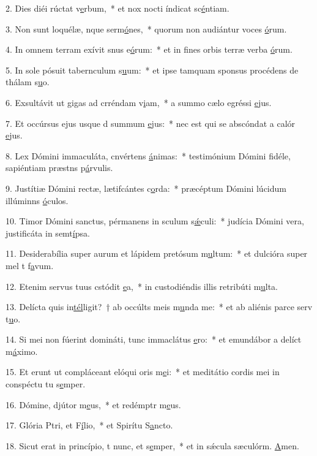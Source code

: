 2. Dies diéi rúctat v\uline{e}rbum,~* et nox nocti índicat sc\uline{é}ntiam.\par 
3. Non sunt loquélæ, nque serm\uline{ó}nes,~* quorum non audiántur voces \uline{ó}rum.\par 
4. In omnem terram exívit snus e\uline{ó}rum:~* et in fines orbis terræ verba \uline{ó}rum.\par 
5. In sole pósuit tabernculum s\uline{u}um:~* et ipse tamquam sponsus procédens de thálam s\uline{u}o.\par 
6. Exsultávit ut gigas ad crréndam v\uline{i}am,~* a summo cælo egréssi \uline{e}jus.\par 
7. Et occúrsus ejus usque d summum \uline{e}jus:~* nec est qui se abscóndat a calór \uline{e}jus.\par 
8. Lex Dómini immaculáta, cnvértens \uline{á}nimas:~* testimónium Dómini fidéle, sapiéntiam præstns p\uline{á}rvulis.\par 
9. Justítiæ Dómini rectæ, lætifcántes c\uline{o}rda:~* præcéptum Dómini lúcidum illúminns \uline{ó}culos.\par 
10. Timor Dómini sanctus, pérmanens in sculum s\uline{ǽ}culi:~* judícia Dómini vera, justificáta in semt\uline{í}psa.\par 
11. Desiderabília super aurum et lápidem pretósum m\uline{u}ltum:~* et dulcióra super mel t f\uline{a}vum.\par 
12. Etenim servus tuus cstódit \uline{e}a,~* in custodiéndis illis retribúti m\uline{u}lta.\par 
13. Delícta quis in\uline{tél}ligit?~† ab occúlts meis m\uline{u}nda me:~* et ab aliénis parce serv t\uline{u}o.\par 
14. Si mei non fúerint domináti, tunc immaclátus \uline{e}ro:~* et emundábor a delíct m\uline{á}ximo.\par 
15. Et erunt ut compláceant elóqui oris m\uline{e}i:~* et meditátio cordis mei in conspéctu tu s\uline{e}mper.\par 
16. Dómine, djútor m\uline{e}us,~* et redémptr m\uline{e}us.\par 
17. Glória Ptri, et F\uline{í}lio,~* et Spirítu S\uline{a}ncto.\par 
18. Sicut erat in princípio, t nunc, et s\uline{e}mper,~* et in sǽcula sæculórm. \uline{A}men.\par 
